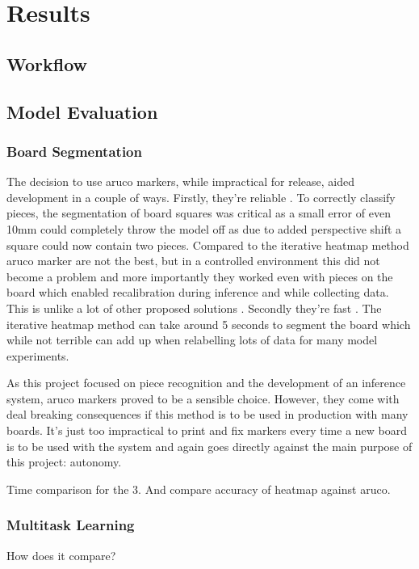 \chapter{Results}
\label{results}

\section{Workflow}


\section{Model Evaluation}


\subsection{Board Segmentation}
The decision to use aruco markers, while impractical for release, aided development in a couple of ways.  Firstly, they're reliable \cite{}.
To correctly classify pieces, the segmentation of board squares was critical as a small error of even 10mm could completely throw the
model off as due to added perspective shift a square could now contain two pieces.  Compared to the iterative heatmap method \cite{} aruco 
marker are not the best, but in a controlled environment this did not become a problem and more importantly they worked even with pieces on the
board which enabled recalibration during inference and while collecting data.  This is unlike a lot of other proposed solutions \cite{}.
Secondly they're fast \cite{}.  The iterative heatmap method can take around 5 seconds to segment the board which while not terrible can add up when 
relabelling lots of data for many model experiments.

As this project focused on piece recognition and the development of an inference system, aruco markers proved to be a sensible choice.  However, 
they come with deal breaking consequences if this method is to be used in production with many boards.  It's just too impractical to print and fix
markers every time a new board is to be used with the system and again goes directly against the main purpose of this project: autonomy.

Time comparison for the 3.  And compare accuracy of heatmap against aruco.

\subsection{Multitask Learning}
How does it compare?

